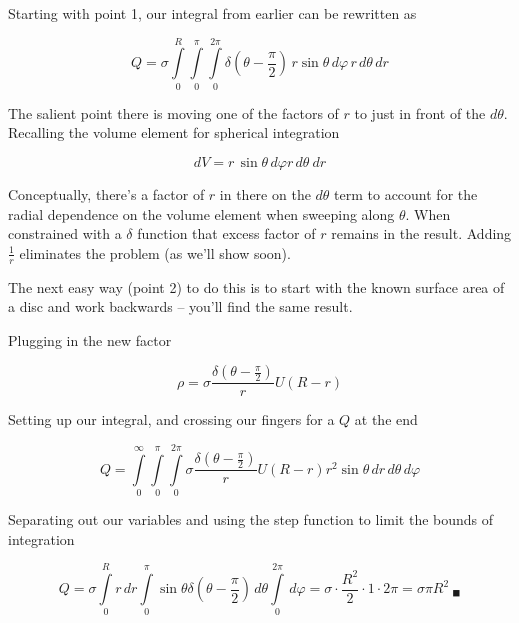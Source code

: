 Starting with point 1, our integral from earlier can be rewritten as 

\begin{equation}
  Q =
  \sigma
  \int\limits_0^R
  \int\limits_0^\pi
  \int\limits_0^{2\pi}
  \delta(\theta - \frac \pi 2)
  \,r \sin{\theta} \, d\varphi
  \,r \, d\theta
  \, dr
\end{equation}

The salient point there is moving one of the factors of $r$ to just in
front of the $d\theta$.  Recalling the volume element for spherical
integration

\begin{equation}
  dV = r\,\sin{\theta}\,d\varphi r\,d\theta\ dr
\end{equation}

Conceptually, there's a factor of $r$ in there on the $d\theta$ term
to account for the radial dependence on the volume element when
sweeping along $\theta$. When constrained with a $\delta$ function
that excess factor of $r$ remains in the result.  Adding $\frac 1 r$
eliminates the problem (as we'll show soon).

The next easy way (point 2) to do this is to start with the known
surface area of a disc and work backwards -- you'll find the same
result.

Plugging in the new factor

\begin{equation}
  \rho = \sigma \frac{\delta(\theta - \frac \pi 2)}{r} U(R - r)
\end{equation}

Setting up our integral, and crossing our fingers for a $Q$ at the end

\begin{equation}
  Q =
  \int\limits_0^\infty
  \int\limits_0^\pi
  \int\limits_0^{2\pi}
  \sigma \frac{\delta(\theta - \frac \pi 2)}{r} U(R - r)
  r^2\sin{\theta}
  \, dr
  \, d\theta
  \, d\varphi
\end{equation}

Separating out our variables and using the step function to limit the
bounds of integration

\begin{equation}
  Q =
  \sigma
  \int\limits_0^R
  r
  \, dr
  \int\limits_0^\pi
  \sin{\theta}
  \delta(\theta - \frac \pi 2)
  \, d\theta
  \int\limits_0^{2\pi}
  \, d\varphi
  = \sigma \cdot \frac{R^2}{2} \cdot 1 \cdot 2\pi
  = \sigma \pi R^2
  \ _\blacksquare
\end{equation}
